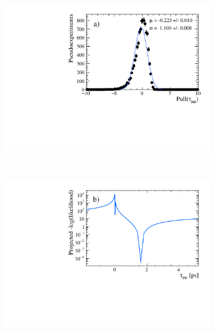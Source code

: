 {\begin{figure}[tbp]
    \centering
   \begin{subfigure}[b]{0.48\textwidth}
        \includegraphics[width= \textwidth]{./Figs/LifetimeMeasurement/CKM_simple_tau_pull.pdf}
    \end{subfigure}
   ~ %
    \begin{subfigure}[b]{0.48\textwidth}
       \includegraphics[width=\textwidth]{./Figs/LifetimeMeasurement/tau_LL.pdf}

\end{subfigure}
\end{figure}}
